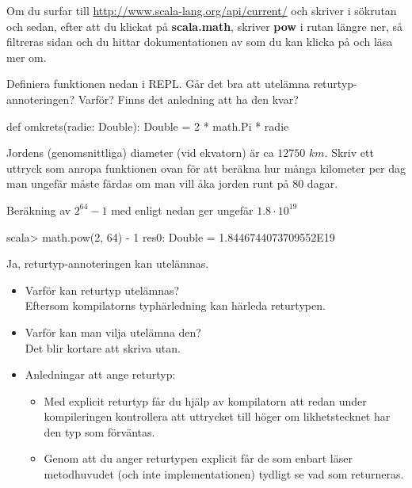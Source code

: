 Om du surfar till \url{http://www.scala-lang.org/api/current/} och skriver  i sökrutan och sedan, efter att du klickat på \textbf{\textsf{\small scala.math}}, skriver \textbf{\textsf{\small pow}} i rutan längre ner, så filtreras sidan och du hittar dokumentationen av  som du kan klicka på och läsa mer om.

\Subtask Definiera funktionen  nedan i REPL. Går det bra att utelämna returtyp-annoteringen? Varför? Finns det anledning att ha den kvar?
\begin{Code}
def omkrets(radie: Double): Double = 2 * math.Pi * radie
\end{Code}

\Subtask Jordens (genomsnittliga) diameter (vid ekvatorn) är ca $12 750$ $km$. Skriv ett uttryck som anropa funktionen  ovan för att beräkna hur många kilometer per dag man ungefär måste färdas om man vill åka jorden runt på 80 dagar.

\SOLUTION

\TaskSolved \what

\SubtaskSolved Beräkning av $2^{64} - 1$ med  enligt nedan ger ungefär $1.8 \cdot 10^{19}$
\begin{REPL}
scala> math.pow(2, 64) - 1
res0: Double = 1.8446744073709552E19
\end{REPL}

\SubtaskSolved Ja, returtyp-annoteringen  kan utelämnas.

\begin{itemize}
\item Varför kan returtyp utelämnas?\\Eftersom kompilatorns typhärledning kan härleda returtypen.
\item Varför kan man vilja utelämna den?\\Det blir kortare att skriva utan.
\item Anledningar att ange returtyp:
\begin{itemize}
\item  Med explicit returtyp får du hjälp av kompilatorn att redan under kompileringen kontrollera att uttrycket till höger om likhetstecknet har den typ som förväntas.

\item Genom att du anger returtypen explicit får de som enbart läser metodhuvudet (och inte implementationen)
 tydligt se vad som returneras.
\end{itemize}
\end{itemize}

